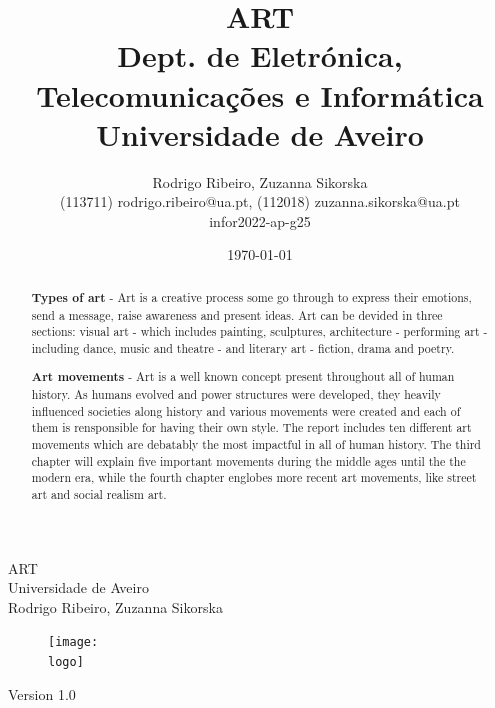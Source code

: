\documentclass{report}
\begin{document}
%
\def\titledoc{ART}
\def\datedoc{DATE}
\def\authors{Rodrigo Ribeiro, Zuzanna Sikorska}
\def\authorscontacts{(113711) rodrigo.ribeiro@ua.pt, (112018) zuzanna.sikorska@ua.pt}
\def\version{Version 1.0}
\def\department{Dept. de Eletrónica, Telecomunicações e Informática}
\def\company{Universidade de Aveiro}
\def\logo{img/ua.pdf}
\def\repository{infor2022-ap-g25}
%
%
\begin{titlepage}

\begin{center}
%
\vspace*{50mm}
%
{\Huge \titledoc}\\ 
%
\vspace{10mm}
%
{\Large \company}\\
%
\vspace{10mm}
%
{\LARGE \authors}\\ 
%
\vspace{30mm}
%
\begin{figure}[h]
\center
\texttt{[image: \\logo]}
\end{figure}
%
\vspace{30mm}
\end{center}
%
\begin{flushright}
\version
\end{flushright}
\end{titlepage}

\title{%
{\Huge\textbf{\titledoc}}\\
{\Large \department\\ \company}
}
%
\author{%
    \authors \\
    \authorscontacts \\
    \repository
}
%
\date{\today}
%
\maketitle


\begin{abstract}

\textbf{Types of art}  - Art is a creative process some go through to express their emotions, send a message, raise awareness and present ideas. Art can be devided in three sections: visual art - which includes painting, sculptures, architecture - performing art - including dance, music and theatre - and literary art - fiction, drama and poetry.


\textbf{Art movements} - Art is a well known concept present throughout all of human history. As humans evolved and power structures were developed, they heavily influenced societies along history and various movements were created and each of them is rensponsible for having their own style. The report includes ten different art movements which are debatably the most impactful in all of human history. The third chapter will explain five important movements during the middle ages until the the modern era, while the fourth chapter englobes more recent art movements, like street art and social realism art.

\end{abstract}
\end{document}
